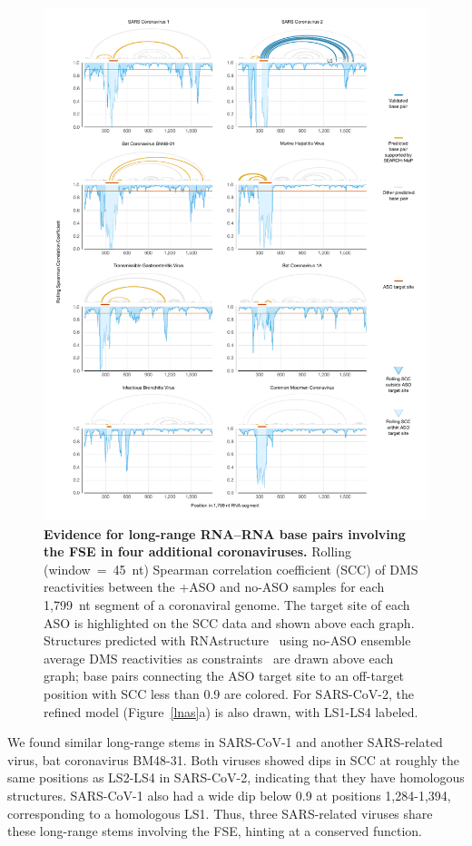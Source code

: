 \documentclass[main.tex]{subfiles}
\begin{document}
\begin{figure}[H]
	\includegraphics[width=\textwidth]{../MainFigures/covs/covs.pdf}
	\caption{\textbf{Evidence for long-range RNA--RNA base pairs involving the FSE in four additional coronaviruses.} Rolling (window~=~45~nt) Spearman correlation coefficient (SCC) of DMS reactivities between the +ASO and no-ASO samples for each 1,799~nt segment of a coronaviral genome. The target site of each ASO is highlighted on the SCC data and shown above each graph. Structures predicted with RNAstructure~\cite{Reuter2010} using no-ASO ensemble average DMS reactivities as constraints~\cite{Cordero2012} are drawn above each graph; base pairs connecting the ASO target site to an off-target position with SCC less than 0.9 are colored. For SARS-CoV-2, the refined model (Figure~\ref{lnas}a) is also drawn, with LS1-LS4 labeled.}
	\label{covs}
\end{figure}

We found similar long-range stems in SARS-CoV-1 and another SARS-related virus, bat coronavirus BM48-31.
Both viruses showed dips in SCC at roughly the same positions as LS2-LS4 in SARS-CoV-2, indicating that they have homologous structures.
SARS-CoV-1 also had a wide dip below 0.9 at positions 1,284-1,394, corresponding to a homologous LS1.
Thus, three SARS-related viruses share these long-range stems involving the FSE, hinting at a conserved function.
\end{document}
